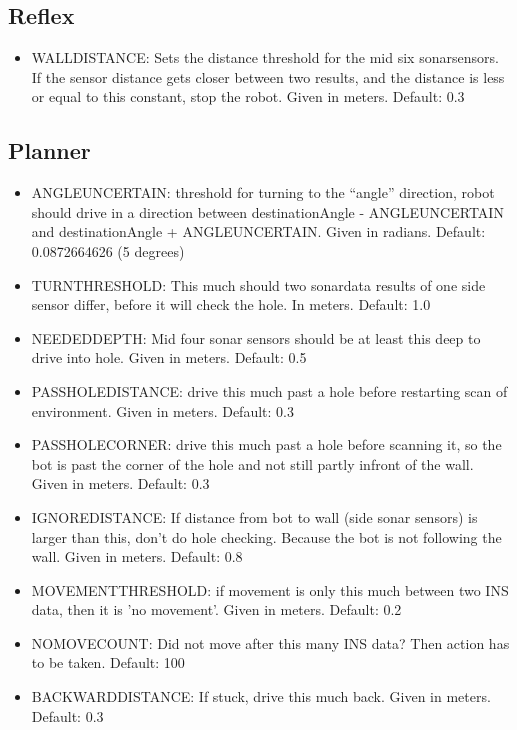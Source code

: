 \documentclass[titlepage, a4paper,10pt]{article}
\begin{document}
\subsection{Reflex}
\begin{itemize}
\item WALLDISTANCE: Sets the distance threshold for the mid six sonarsensors. If the sensor distance gets closer between two results, and the distance is less or equal to this constant, stop the robot. Given in meters. Default: 0.3
\end{itemize}

\subsection{Planner}
\begin{itemize}
\item ANGLEUNCERTAIN: threshold for turning to the ``angle'' direction, robot should drive in a direction between destinationAngle - ANGLEUNCERTAIN and destinationAngle + ANGLEUNCERTAIN. Given in radians. Default: 0.0872664626 (5 degrees)

\item TURNTHRESHOLD: This much should two sonardata results of one side sensor differ, before it will check the hole. In meters. Default: 1.0 

\item NEEDEDDEPTH: Mid four sonar sensors should be at least this deep to drive into hole. Given in meters. Default: 0.5

\item PASSHOLEDISTANCE: drive this much past a hole before restarting scan of environment. Given in meters. Default: 0.3

\item PASSHOLECORNER: drive this much past a hole before scanning it, so the bot is past the corner of the hole and not still partly infront of the wall. Given in meters. Default: 0.3

\item IGNOREDISTANCE: If distance from bot to wall (side sonar sensors) is larger than this, don't do hole checking. Because the bot is not following the wall. Given in meters. Default: 0.8

\item MOVEMENTTHRESHOLD: if movement is only this much between two INS data, then it is 'no movement'. Given in meters. Default: 0.2

\item NOMOVECOUNT: Did not move after this many INS data? Then action has to be taken. Default: 100

\item BACKWARDDISTANCE: If stuck, drive this much back. Given in meters. Default: 0.3

\end{itemize}
\end{document}
